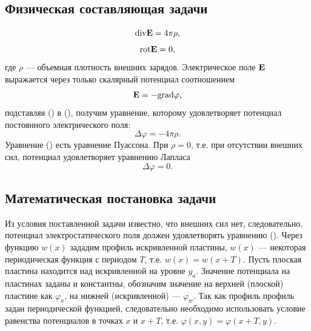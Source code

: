 \documentclass[12pt, a4paper]{article}
\renewcommand{\vec}[1]{\text{\mathversion{bold}${#1}$}}%
\renewcommand{\phi}{\varphi}
\begin{document}
		\subsection{Физическая составляющая задачи}
			\begin{equation}
				\mathrm{div} \vec{\mathrm{E}} = 4 \pi \rho,
				\label{div_E}
			\end{equation}
			\begin{equation}
				\mathrm{rot} \vec{\mathrm{E}} = 0,
				\label{rot_E}
			\end{equation}
			где $\rho$ --- объемная плотность внешних зарядов. Электрическое поле $\vec{\mathrm{E}}$ выражается через только скалярный потенциал соотношением
			\begin{equation}
				\vec{\mathrm{E}} = -\mathrm{grad} \varphi,
				\label{E_grad_phi}
			\end{equation}
			подставляя () в (), получим уравнение, которому удовлетворяет потенциал постоянного электрического поля:
			\begin{equation}
				\Delta \varphi = - 4 \pi \rho.
				\label{Pois_eq}
			\end{equation}
			Уравнение () есть уравнение Пуассона. При $\rho = 0$, т.е. при отсутствии внешних сил, потенциал удовлетворяет уравнению Лапласа
			\begin{equation}
				\Delta \phi = 0.
				\label{Laplace_eq}
			\end{equation}
			
		\subsection{Математическая постановка задачи}
			
			Из условия поставленной задачи известно, что внешних сил нет, следовательно, потенциал электростатического поля должен удовлетворять уравнению (). Через функцию $w(x)$ зададим профиль искривленной пластины, $w(x)$  --- некоторая периодическая функция с периодом $T$, т.е. $w(x) = w(x + T)$. Пусть плоская пластина находится над искривленной на уровне $y_a$. Значение потенциала на пластинах заданы и константны, обозначим значение на верхней (плоской) пластине как $\phi_a$, на нижней (искривленной) --- $\phi_w$. Так как профиль профиль задан периодической функцией, следовательно необходимо использовать условие равенства потенциалов в точках $x$ и $x + T$, т.е. $\phi (x, y) = \phi (x + T, y)$.
			
\end{document}
